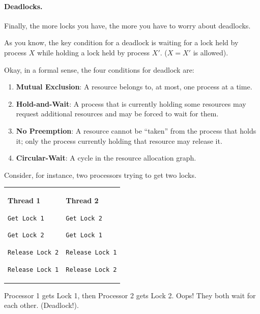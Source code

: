 \documentclass[a4paper]{report}
\begin{document}
\paragraph{Deadlocks.} Finally, the more locks you have, the more you have to worry about deadlocks.

As you know, the key condition for a deadlock is waiting for a lock held by process $X$ while holding a lock held by process $X'$. ($X = X'$ is allowed).

Okay, in a formal sense, the four conditions for deadlock are:

\begin{enumerate}
	\item \textbf{Mutual Exclusion}: A resource belongs to, at most, one process at a time.
	\item \textbf{Hold-and-Wait}: A process that is currently holding some resources may request additional resources and may be forced to wait for them.
	\item \textbf{No Preemption}: A resource cannot be ``taken'' from the process that holds it; only the process currently holding that resource may release it.
	\item \textbf{Circular-Wait}: A cycle in the resource allocation graph.
\end{enumerate}


Consider, for instance, two processors trying to get two locks.

\begin{center}
  \begin{tabular}{ll}
\begin{minipage}{.4\textwidth}
      {\bf Thread 1}

      \verb+Get Lock 1+

      \verb+Get Lock 2+

      \verb+Release Lock 2+

      \verb+Release Lock 1+
\end{minipage} &
\begin{minipage}{.4\textwidth}
      {\bf Thread 2}

      \verb+Get Lock 2+

      \verb+Get Lock 1+

      \verb+Release Lock 1+

      \verb+Release Lock 2+
\end{minipage}
\end{tabular}
\end{center}

 Processor 1 gets Lock 1, then Processor 2 gets Lock 2. Oops! They
 both wait for each other. (Deadlock!).
\end{document}
